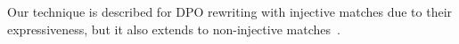 \noindent Our technique is described for DPO rewriting with injective matches due to their expressiveness, but it also extends to non-injective matches~\cite{habel2001double}.


